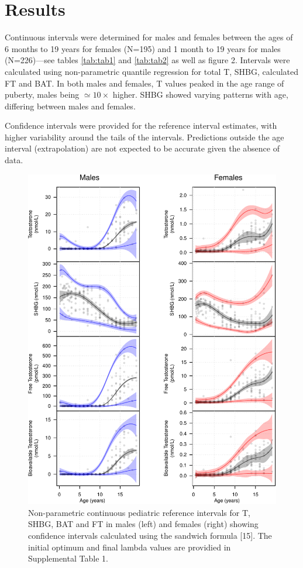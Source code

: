 \documentclass[]{elsarticle} %
\begin{document}
\hypertarget{results}{%
\section{Results}\label{results}}

Continuous intervals were determined for males and females between the
ages of 6 months to 19 years for females (N=195) and 1 month to 19 years
for males (N=226)---see tables \ref{tab:tab1} and \ref{tab:tab2} as well
as figure 2. Intervals were calculated using non-parametric quantile
regression for total T, SHBG, calculated FT and BAT. In both males and
females, T values peaked in the age range of puberty, males being
\(\simeq 10 \times\) higher. SHBG showed varying patterns with age,
differing between males and females.

Confidence intervals were provided for the reference interval estimates,
with higher variability around the tails of the intervals. Predictions
outside the age interval (extrapolation) are not expected to be accurate
given the absence of data.

\begin{figure}[H]
\includegraphics{quantregfitsfig2-1} \caption{\label{fig:fig2}Non-parametric continuous pediatric reference intervals for T, SHBG, BAT and FT in males (left) and females (right) showing confidence intervals calculated using the sandwich formula [15]. The initial optimum and final lambda values are providied in Supplemental Table 1.}\label{fig:quantregfitsfig2}
\end{figure}
\end{document}
